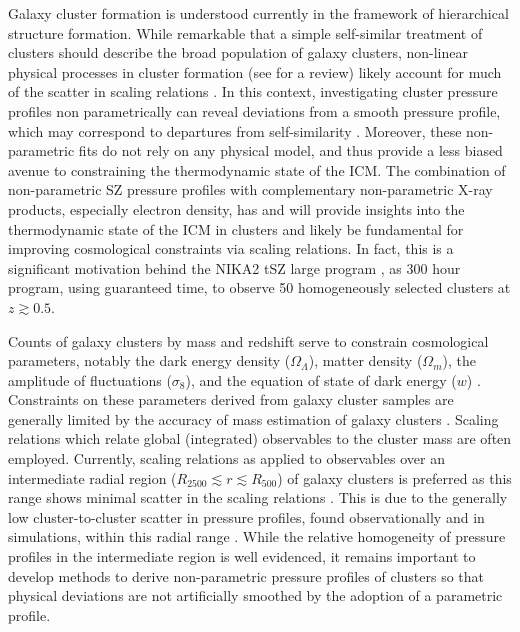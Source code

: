 \documentclass[twocolumn,traditabstract]{aa}
\begin{document}
Galaxy cluster formation is understood currently in the framework of hierarchical structure formation\citep[e.g.][]{press1974}.
While remarkable that a simple self-similar treatment of clusters \citep{kaiser1986} should describe the broad population of
galaxy clusters, non-linear physical processes in cluster formation (see \citet{kravtsov2012} for a review) likely account
for much of the scatter in scaling relations \citep[e.g.][]{battaglia2012}. In this context, investigating cluster pressure profiles
non parametrically can reveal deviations from a smooth pressure profile, which may correspond to departures from self-similarity
\citep{basu2010}. Moreover, these non-parametric fits do not rely on any physical model, and thus provide a less biased avenue
to constraining the thermodynamic state of the ICM. The combination of non-parametric SZ pressure profiles with complementary
non-parametric X-ray products, especially electron density, has \citep[e.g][]{basu2010,planck2013a,ruppin2017}
and will provide insights into the thermodynamic state of the ICM in clusters and likely be fundamental for improving cosmological
constraints via scaling relations. In fact, this is a significant motivation behind the NIKA2 tSZ large program \citep{comis2016},
as 300 hour program, using guaranteed time, to observe 50 homogeneously selected clusters at $z \gtrsim 0.5$.


Counts of galaxy clusters by mass and redshift serve to constrain cosmological parameters, notably the dark energy density
($\Omega_{\Lambda}$), matter density ($\Omega_{m}$), the amplitude of fluctuations ($\sigma_8$), and the equation of state of
dark energy ($w$) \citep{planck2016_szc}. Constraints on these
parameters derived from galaxy cluster samples are generally limited by the accuracy of mass estimation of 
galaxy clusters \citep[e.g.][]{hasselfield2013, reichardt2013}. Scaling relations which relate global (integrated) observables
to the cluster mass are often employed. Currently, scaling relations as applied to observables over an intermediate radial
region ($R_{2500} \lesssim r \lesssim R_{500}$) of galaxy clusters is preferred as this range shows minimal scatter in the
scaling relations \citep[e.g.][]{kravtsov2012}. This is due
to the generally low cluster-to-cluster scatter in pressure profiles, found observationally and in simulations,
within this radial range \citep[e.g.][]{borgani2004,nagai2007,arnaud2010,bonamente2012,planck2013a,sayers2013}.
While the relative homogeneity of pressure profiles in the intermediate region is well evidenced, it remains important to
develop methods to derive non-parametric pressure profiles of clusters so that physical deviations are not artificially
smoothed by the adoption of a parametric profile. 
\end{document}

